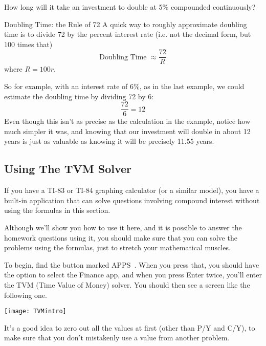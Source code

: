 \begin{try}
How long will it take an investment to double at 5\% compounded continuously?
\end{try}

\begin{proc}{Doubling Time: the Rule of 72}
A quick way to roughly approximate doubling time is to divide 72 by the percent interest rate (i.e. not the decimal form, but 100 times that)
\[\textrm{Doubling Time } \approx \dfrac{72}{R}\]
where $R = 100r$.
\end{proc}

So for example, with an interest rate of 6\%, as in the last example, we could estimate the doubling time by dividing 72 by 6:
\[\dfrac{72}{6} = 12\]
Even though this isn't as precise as the calculation in the example, notice how much simpler it was, and knowing that our investment will double in about 12 years is just as valuable as knowing it will be precisely 11.55 years.
\pagebreak

\subsection{Using The TVM Solver}
If you have a TI-83 or TI-84 graphing calculator (or a similar model), you have a built-in application that can solve questions involving compound interest without using the formulas in this section.

Although we'll show you how to use it here, and it is possible to answer the homework questions using it, you should make sure that you can solve the problems using the formulas, just to stretch your mathematical muscles.

To begin, find the button marked $\boxed{\textrm{APPS}}$\ .  When you press that, you should have the option to select the Finance app, and when you press Enter twice, you'll enter the TVM (Time Value of Money) solver.  You should then see a screen like the following one.

\begin{center}
\texttt{[image: TVMintro]}
\end{center}

It's a good idea to zero out all the values at first (other than P/Y and C/Y), to make sure that you don't mistakenly use a value from another problem.

